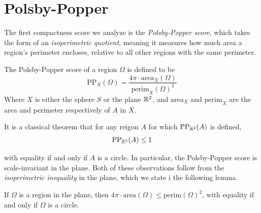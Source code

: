 \section{Polsby-Popper}\label{sec:pp}

The first compactness score we analyze is the \textit{Polsby-Popper score}, which takes the form of an \textit{isoperimetric quotient}, meaning it measures how much area a region's perimeter encloses, relative to all other regions with the same perimeter.
\begin{definition}\label{def:pp}
The Polsby-Popper score of a region $\Omega$ is defined to be $$\mathrm{PP}_X(\Omega) = \frac{4\pi \cdot\mathrm{area}_X(\Omega)}{\mathrm{perim}_X(\Omega)^2}$$
Where $X$ is either the sphere $S$ or the plane $\mathbb{R}^2$, and $\mathrm{area}_X$ and 
$\mathrm{perim}_X$ are the area and perimeter 
respectively of $A$ in $X$.
\end{definition}
\begin{remark}
It is a classical theorem that for any 
reigon $A$ for which $\mathrm{PP}_{\mathbb{R}^2}(A)$ is defined,
$$
\mathrm{PP}_{\mathbb{R}^2}(A)\le 1
$$

with equality if and only if $A$ is a circle. In particular, the Polsby-Popper score is scale-invariant in the plane.  Both of these observations follow from the \textit{isoperimetric inequality} in the plane, which we state i the following lemma.
\begin{lemma}
If $\Omega$ is a region in the plane, then $4\pi\cdot\mathrm{area}(\Omega)\leq \mathrm{perim}(\Omega)^2$, with equality if and only if $\Omega$ is a circle.
\end{lemma}
\end{remark}
